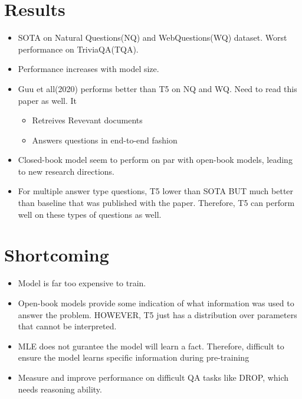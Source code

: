 \documentclass[a4paper]{article}
\begin{document}
\section{Results}
\begin{itemize}
    \item SOTA on Natural Questions(NQ) and WebQuestions(WQ) dataset. Worst performance on TriviaQA(TQA).
    \item Performance increases with model size.
    \item Guu et all(2020) performs better than T5 on NQ and WQ. Need to read this paper as well. It 
    \begin{itemize}
        \item Retreives Revevant documents
        \item Answers questions in end-to-end fashion
    \end{itemize}
    \item Closed-book model seem to perform on par with open-book models, leading to new research directions.
    \item For multiple answer type questions, T5 lower than SOTA BUT much better than baseline that was published with the paper. Therefore, T5 can perform well on these types of questions as well.
\end{itemize}
\section{Shortcoming}
\begin{itemize}
    \item Model is far too expensive to train.
    \item Open-book models provide some indication of what information was used to answer the problem. HOWEVER, T5 just has a distribution over parameters that cannot be interpreted.
    \item MLE does not gurantee the model will learn a fact. Therefore, difficult to ensure the model learns specific information during pre-training
    \item Measure and improve performance on difficult QA tasks like DROP, which needs reasoning ability.
\end{itemize}
\end{document}
